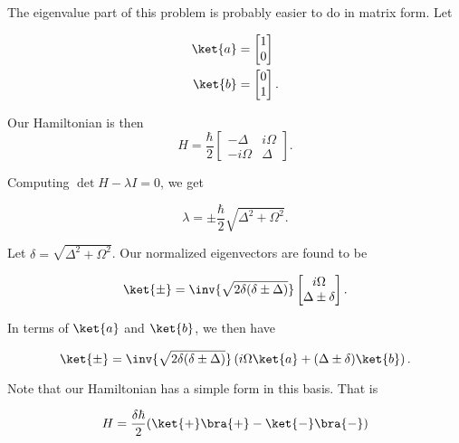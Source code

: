 The eigenvalue part of this problem is probably easier to do in matrix form.  Let 

\begin{align}\label{eqn:qmIexamPractice2008Dec:2:20}
\ket{a} &= 
\begin{bmatrix}
1 \\
0
\end{bmatrix} \\
\ket{b} &= 
\begin{bmatrix}
0 \\
1
\end{bmatrix}.
\end{align}

Our Hamiltonian is then
\begin{equation}\label{eqn:qmIexamPractice2008Dec:2:30}
H = \frac{\hbar}{2} 
\begin{bmatrix}
-\Delta & i \Omega \\
-i \Omega & \Delta
\end{bmatrix}.
\end{equation}

Computing $\det{H - \lambda I} = 0$, we get

\begin{equation}\label{eqn:qmIexamPractice2008Dec:2:40}
\lambda = \pm \frac{\hbar}{2} \sqrt{ \Delta^2 + \Omega^2 }.
\end{equation}

Let $\delta = \sqrt{ \Delta^2 + \Omega^2 }$.  Our normalized eigenvectors are found to be

\begin{equation}\label{eqn:qmIexamPractice2008Dec:2:50}
\ket{\pm} = \inv{\sqrt{ 2 \delta (\delta \pm \Delta)} }
\begin{bmatrix}
i \Omega \\
\Delta \pm \delta
\end{bmatrix}.
\end{equation}

In terms of $\ket{a}$ and $\ket{b}$, we then have

\begin{equation}\label{eqn:qmIexamPractice2008Dec:2:60}
\ket{\pm} = \inv{\sqrt{ 2 \delta (\delta \pm \Delta)} }
\left(
i \Omega \ket{a}
+ (\Delta \pm \delta) \ket{b} \right).
\end{equation}

Note that our Hamiltonian has a simple form in this basis.  That is

\begin{equation}\label{eqn:qmIexamPractice2008Dec:2:70}
H = \frac{\delta \hbar}{2} (\ket{+}\bra{+} - \ket{-}\bra{-} )
\end{equation}

